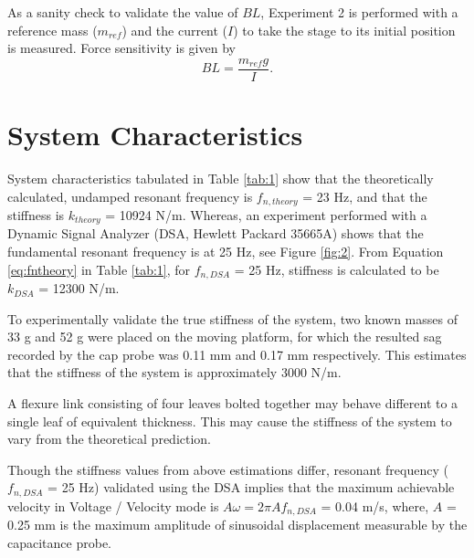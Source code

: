 \documentclass[12pt]{article}
\begin{document}
As a sanity check to validate the value of $BL$, Experiment 2 is performed with a reference mass ($m_{ref}$) and the current ($I$) to take the stage to its initial position is measured. Force sensitivity is given by 
\begin{equation}
BL = \frac{m_{ref}g}I.
\end{equation}

\section{System Characteristics}

System characteristics tabulated in Table \ref{tab:1} show that the theoretically calculated, undamped resonant frequency is $f_{n,theory}$ = 23 Hz, and that the stiffness is $k_{theory}$ = 10924 N/m. Whereas, an experiment performed with a Dynamic Signal Analyzer (DSA, Hewlett Packard 35665A) shows that the fundamental resonant frequency is at 25 Hz, see Figure \ref{fig:2}. From Equation \ref{eq:fntheory} in Table \ref{tab:1}, for $f_{n,DSA}$ = 25 Hz, stiffness is calculated to be $k_{DSA}$ = 12300 N/m. 

To experimentally validate the true stiffness of the system, two known masses of 33 g and 52 g were placed on the moving platform, for which the resulted sag recorded by the cap probe was 0.11 mm and 0.17 mm respectively. This estimates that the stiffness of the system is approximately 3000 N/m. 

A flexure link consisting of four leaves bolted together may behave different to a single leaf of equivalent thickness. This may cause the stiffness of the system to vary from the theoretical prediction.

Though the stiffness values from above estimations differ, resonant frequency ($f_{n,DSA}$ = 25 Hz) validated using the DSA implies that the maximum achievable velocity in Voltage / Velocity mode is $A\omega = 2\pi{}Af_{n,DSA}$ = 0.04 m/s, where, $A$ = 0.25 mm is the maximum amplitude of sinusoidal displacement measurable by the capacitance probe.
\end{document}
